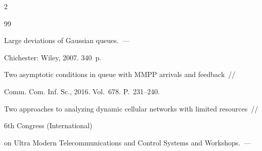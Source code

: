 

















 \begin{multicols}{2}





\renewcommand{\bibname}{\protect\rmfamily Литература}







{\small\frenchspacing


{%


\begin{thebibliography}{99}







 Large deviations of Gaussian queues.~--- 


Chichester: Wiley, 2007. 340~p.









Two asymptotic conditions in queue with MMPP arrivals and feedback~// 


Comm. Com. Inf. Sc., 2016. Vol.~678. P.~231--240.









Two approaches to analyzing dynamic cellular networks with limited resources~//  


6th Congress (International)


on Ultra Modern Telecommunications and Control Systems and Workshops.~--- 



\end{thebibliography}}}
\end{multicols}
